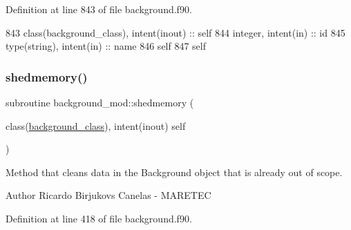 Definition at line 843 of file background.\+f90.


\begin{DoxyCode}
843     \textcolor{keywordtype}{class}(background\_class), \textcolor{keywordtype}{intent(inout)} :: self
844     \textcolor{keywordtype}{integer}, \textcolor{keywordtype}{intent(in)} :: id
845     \textcolor{keywordtype}{type}(string), \textcolor{keywordtype}{intent(in)} :: name
846     self%
847     self%
\end{DoxyCode}
\mbox{\label{namespacebackground__mod_a2c75c9011305adad2f19fc2233df700d}} 
\subsubsection{\texorpdfstring{shedmemory()}{shedmemory()}}
{\footnotesize\ttfamily subroutine background\+\_\+mod\+::shedmemory (\begin{DoxyParamCaption}\item[{class(\mbox{\hyperlink{structbackground__mod_1_1background__class}{background\+\_\+class}}), intent(inout)}]{self }\end{DoxyParamCaption})\hspace{0.3cm}{\ttfamily [private]}}



Method that cleans data in the Background object that is already out of scope. 

\begin{DoxyAuthor}{Author}
Ricardo Birjukovs Canelas -\/ M\+A\+R\+E\+T\+EC 
\end{DoxyAuthor}


Definition at line 418 of file background.\+f90.


